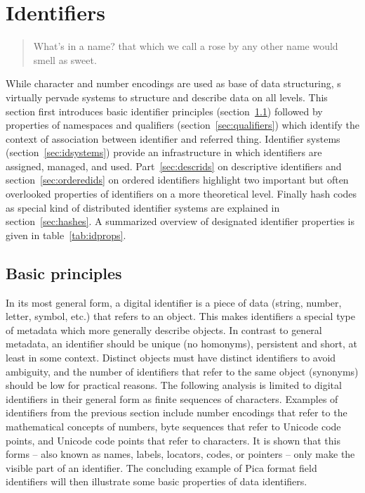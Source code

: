 \section{Identifiers}
\label{sec:identifiers}

\begin{quotation}%
What's in a name? that which we call a rose by any other name would smell as sweet.\\
\end{quotation}


\noindent While character and number encodings are used as base of data
structuring, s virtually pervade systems to structure and
describe data on all levels. This section first introduces basic identifier
principles (section~\ref{sec:idbasics}) followed by properties of namespaces and
qualifiers (section~\ref{sec:qualifiers}) which identify the context of
association between identifier and referred thing. Identifier systems
(section~\ref{sec:idsystems}) provide an infrastructure in which identifiers are
assigned, managed, and used. Part~\ref{sec:descrids} on descriptive identifiers
and section~\ref{sec:orderedids} on ordered identifiers highlight two important
but often overlooked properties of identifiers on a more theoretical level.
Finally hash codes as special kind of distributed identifier systems are
explained in section~\ref{sec:hashes}. A summarized overview of designated
identifier properties is given in table~\ref{tab:idprops}.

\subsection{Basic principles}
\label{sec:idbasics}

In its most general form, a digital identifier is a piece of data (string,
number, letter, symbol, etc.) that refers to an object. This makes
identifiers a special type of metadata which more generally describe objects.
In contrast to general metadata, an identifier should be unique (no homonyms), 
persistent and short, at least in some context. Distinct objects must have 
distinct identifiers to avoid ambiguity, and the number of identifiers that 
refer to the same object (synonyms) should be low for practical reasons. The 
following analysis is limited to digital identifiers in their general form as 
finite sequences of characters. Examples of identifiers from the previous 
section include number encodings that refer to the mathematical concepts of 
numbers, byte sequences that refer to Unicode code points, and Unicode code 
points that refer to characters. It is shown that this forms -- also known as
names, labels, locators, codes, or pointers -- only make the visible part of
an identifier. The concluding example of Pica format field identifiers will 
then illustrate some basic properties of data identifiers. 

